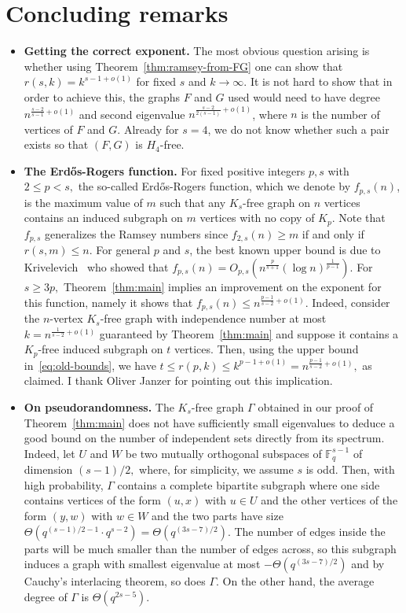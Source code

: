 \documentclass{article}
\theoremstyle{plain}
\theoremstyle{definition}
\newcommand{\bF}{\mathbb{F}}
\begin{document}
\section{Concluding remarks} \label{sec:concluding}
\begin{itemize}
    \item \textbf{Getting the correct exponent.} The most obvious question arising is whether using Theorem~\ref{thm:ramsey-from-FG} one can show that $r(s, k) = k^{s-1 + o(1)}$ for fixed $s$ and $k \rightarrow \infty$. It is not hard to show that in order to achieve this, the graphs $F$ and $G$ used would need to have degree $n^{\frac{s-2}{s-1} + o(1)}$ and second eigenvalue $n^{\frac{s-2}{2(s-1)} + o(1)}$, where $n$ is the number of vertices of $F$ and $G$. Already for $s=4$, we do not know whether such a pair exists so that $(F, G)$ is $H_4$-free.
    
    \item \textbf{The Erd\H{o}s-Rogers function.} For fixed positive integers $p, s$ with $2 \le p < s,$ the so-called Erd\H{o}s-Rogers function, which we denote by $f_{p, s}(n)$, is the maximum value of $m$ such that any $K_s$-free graph on $n$ vertices contains an induced subgraph on $m$ vertices with no copy of $K_p$. Note that $f_{p, s}$ generalizes the Ramsey numbers since $f_{2, s}(n) \ge m$ if and only if $r(s, m) \le n$. For general $p$ and $s$, the best known upper bound is due to Krivelevich~\cite{krivelevich-erdos-rogers} who showed that $f_{p, s}(n) = O_{p,s}(n^{\frac{p}{s+1}} (\log n)^{\frac{1}{p-1}}).$ For $s \ge 3p,$ Theorem~\ref{thm:main} implies an improvement on the exponent for this function, namely it shows that $f_{p, s}(n) \le n^{\frac{p-1}{s-2} + o(1)}.$ Indeed, consider the $n$-vertex $K_s$-free graph with independence number at most $k = n^{\frac{1}{s-2} + o(1)}$ guaranteed by Theorem~\ref{thm:main} and suppose it contains a $K_p$-free induced subgraph on $t$ vertices. Then, using the upper bound in~\eqref{eq:old-bounds}, we have $t \le r(p, k) \le k^{p-1 + o(1)} = n^{\frac{p-1}{s-2} + o(1)},$ as claimed. I thank Oliver Janzer for pointing out this implication.
    
    \item \textbf{On pseudorandomness.} The $K_s$-free graph $\Gamma$ obtained in our proof of Theorem~\ref{thm:main} does not have sufficiently small eigenvalues to deduce a good bound on the number of independent sets directly from its spectrum. Indeed, let $U$ and $W$ be two mutually orthogonal subspaces of $\bF_q^{s-1}$ of dimension $(s-1)/2,$ where, for simplicity, we assume $s$ is odd. Then, with high probability, $\Gamma$ contains a complete bipartite subgraph where one side contains vertices of the form $(u, x)$ with $u \in U$ and the other vertices of the form $(y, w)$ with $w \in W$ and the two parts have size $\Theta(q^{(s-1) / 2 - 1} \cdot q^{s-2}) = \Theta(q^{(3s-7)/2}).$ The number of edges inside the parts will be much smaller than the number of edges across, so this subgraph induces a graph with smallest eigenvalue at most $-\Theta(q^{(3s-7)/2})$ and by Cauchy's interlacing theorem, so does $\Gamma$. On the other hand, the average degree of $\Gamma$ is $\Theta(q^{2s-5})$.


\end{itemize}
\end{document}
